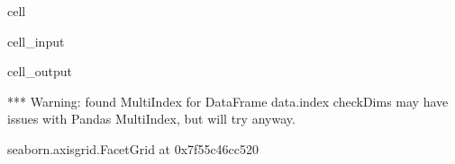 \documentclass[letterpaper,table,10pt,english]{jupyterBook}
\begin{document}
\begin{sphinxuseclass}{cell}\begin{sphinxVerbatimInput}

\begin{sphinxuseclass}{cell_input}
\begin{sphinxVerbatim}[commandchars=\\\{\}]
  
     
                 
                     
\end{sphinxVerbatim}

\end{sphinxuseclass}\end{sphinxVerbatimInput}
\begin{sphinxVerbatimOutput}

\begin{sphinxuseclass}{cell_output}
\begin{sphinxVerbatim}[commandchars=\\\{\}]
*** Warning: found MultiIndex for DataFrame data.index \PYGZhy{} checkDims may have issues with Pandas MultiIndex, but will try anyway.
\end{sphinxVerbatim}

\begin{sphinxVerbatim}[commandchars=\\\{\}]
\PYGZlt{}seaborn.axisgrid.FacetGrid at 0x7f55c46cc520\PYGZgt{}
\end{sphinxVerbatim}

\noindent{}

\end{sphinxuseclass}\end{sphinxVerbatimOutput}

\end{sphinxuseclass}
\end{document}
